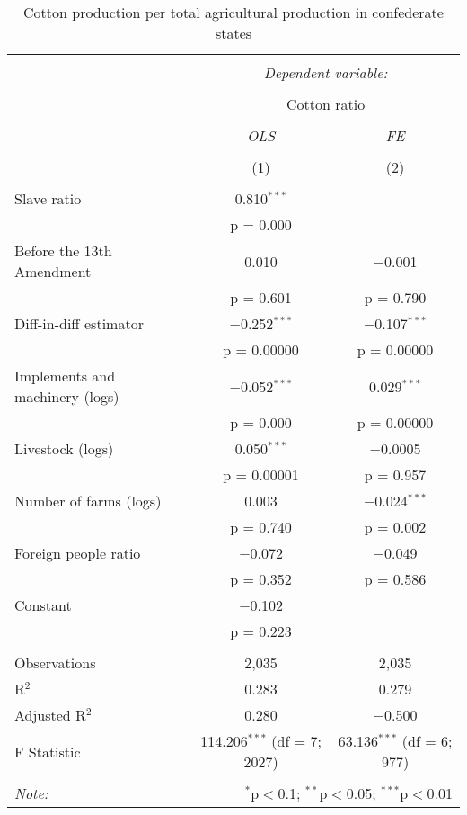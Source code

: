 \documentclass[12pt]{report}
\begin{document}
\begin{table}[!htbp] \centering 
  \caption{Cotton production per total agricultural production in confederate states} 
  \label{tab:cotnopopcsa} 
\begin{tabular}{@{\extracolsep{5pt}}lcc} 
\\[-1.8ex]\hline 
\hline \\[-1.8ex] 
 & \multicolumn{2}{c}{\textit{Dependent variable:}} \\ 
\cline{2-3} 
\\[-1.8ex] & \multicolumn{2}{c}{Cotton ratio} \\ 
\\[-1.8ex] & \textit{OLS} & \textit{FE} \\ 
\\[-1.8ex] & (1) & (2)\\ 
\hline \\[-1.8ex] 
 Slave ratio & 0.810$^{***}$ &  \\ 
  & p = 0.000 &  \\ 
  Before the 13th Amendment & 0.010 & $-$0.001 \\ 
  & p = 0.601 & p = 0.790 \\ 
  Diff-in-diff estimator & $-$0.252$^{***}$ & $-$0.107$^{***}$ \\ 
  & p = 0.00000 & p = 0.00000 \\ 
  Implements and machinery (logs) & $-$0.052$^{***}$ & 0.029$^{***}$ \\ 
  & p = 0.000 & p = 0.00000 \\ 
  Livestock (logs) & 0.050$^{***}$ & $-$0.0005 \\ 
  & p = 0.00001 & p = 0.957 \\ 
  Number of farms (logs) & 0.003 & $-$0.024$^{***}$ \\ 
  & p = 0.740 & p = 0.002 \\ 
  Foreign people ratio & $-$0.072 & $-$0.049 \\ 
  & p = 0.352 & p = 0.586 \\ 
  Constant & $-$0.102 &  \\ 
  & p = 0.223 &  \\ 
 \hline \\[-1.8ex] 
Observations & 2,035 & 2,035 \\ 
R$^{2}$ & 0.283 & 0.279 \\ 
Adjusted R$^{2}$ & 0.280 & $-$0.500 \\ 
F Statistic & 114.206$^{***}$ (df = 7; 2027) & 63.136$^{***}$ (df = 6; 977) \\ 
\hline 
\hline \\[-1.8ex] 
\textit{Note:}  & \multicolumn{2}{r}{$^{*}$p$<$0.1; $^{**}$p$<$0.05; $^{***}$p$<$0.01} \\ 
\end{tabular} 
\end{table} 
\end{document}
